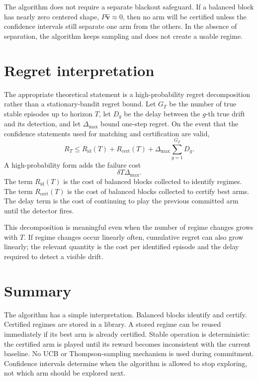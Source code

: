 \documentclass[11pt]{article}
\begin{document}
The algorithm does not require a separate blackout safeguard. If a balanced block has nearly zero centered shape, $P\widehat{\bm v}\approx 0$, then no arm will be certified unless the confidence intervals still separate one arm from the others. In the absence of separation, the algorithm keeps sampling and does not create a usable regime.

\section{Regret interpretation}

The appropriate theoretical statement is a high-probability regret decomposition rather than a stationary-bandit regret bound. Let $G_T$ be the number of true stable episodes up to horizon $T$, let $D_g$ be the delay between the $g$-th true drift and its detection, and let $\Delta_{\max}$ bound one-step regret. On the event that the confidence statements used for matching and certification are valid,
\begin{equation}
    R_T
    \leq
    R_{\mathrm{id}}(T)
    +
    R_{\mathrm{cert}}(T)
    +
    \Delta_{\max}\sum_{g=1}^{G_T}D_g.
    \label{eq:regret}
\end{equation}
A high-probability form adds the failure cost
\begin{equation}
    \delta T\Delta_{\max}.
\end{equation}
The term $R_{\mathrm{id}}(T)$ is the cost of balanced blocks collected to identify regimes. The term $R_{\mathrm{cert}}(T)$ is the cost of balanced blocks collected to certify best arms. The delay term is the cost of continuing to play the previous committed arm until the detector fires.

This decomposition is meaningful even when the number of regime changes grows with $T$. If regime changes occur linearly often, cumulative regret can also grow linearly; the relevant quantity is the cost per identified episode and the delay required to detect a visible drift.

\section{Summary}

The algorithm has a simple interpretation. Balanced blocks identify and certify. Certified regimes are stored in a library. A stored regime can be reused immediately if its best arm is already certified. Stable operation is deterministic: the certified arm is played until its reward becomes inconsistent with the current baseline. No UCB or Thompson-sampling mechanism is used during commitment. Confidence intervals determine when the algorithm is allowed to stop exploring, not which arm should be explored next.
\end{document}
